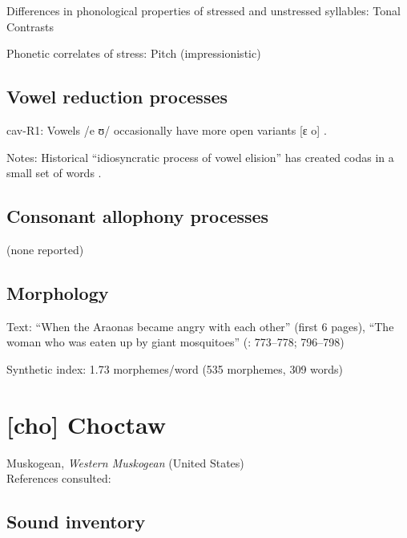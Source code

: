 {\begin{appendixdesc}
\item[Differences in phonological properties of stressed and unstressed syllables:] Tonal Contrasts

\item[Phonetic correlates of stress:] Pitch (impressionistic)
\end{appendixdesc}
\subsection*{Vowel reduction processes}
\begin{appendixdesc}

\item[cav-R1:] Vowels /e ʊ/ occasionally have more open variants [ɛ o] \citep[29]{Guillaume2008}.

\item[Notes:] Historical “idiosyncratic process of vowel elision” has created codas in a small set of words \citep[29]{Guillaume2008}.
\end{appendixdesc}
\subsection*{Consonant allophony processes}

(none reported)

\subsection*{Morphology}

\begin{appendixdesc}
\item[Text:] “When the Araonas became angry with each other” (first 6 pages), “The woman who was eaten up by giant mosquitoes” (\citealt{Guillaume2008}: 773--778; 796--798)

\item[Synthetic index:] 1.73 morphemes/word (535 morphemes, 309 words)
\end{appendixdesc}
\section*{[cho] Choctaw}  %
Muskogean, \textit{Western Muskogean} (United States)\medskip\\
References consulted: \citet{Broadwell2006}

\subsection*{Sound inventory}
\begin{appendixdesc}


\end{appendixdesc}}
